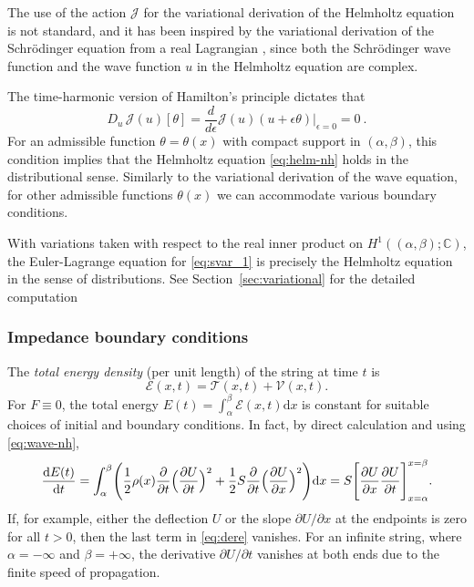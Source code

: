\documentclass[twoside,11pt]{article}
\def\d{{\mathrm d}}
\begin{document}
{The use of the action $\mathcal{J}$ for the variational derivation of the Helmholtz equation is not standard, and it has been inspired by the variational derivation of the Schr\"odinger equation from a real Lagrangian \cite{Mo_book}, since both the  Schr\"odinger wave function and the wave function $u$ in the Helmholtz equation are complex.

The time-harmonic version of Hamilton's principle dictates that
\begin{equation}\label{eq:svar_1}
 {D_{u}\, \mathcal{J}{(u)}[\theta]=\frac{d}{d\epsilon}\mathcal{J}{(u)}(u+\epsilon \theta)|_{\epsilon=0}=0} \ .
\end{equation}
For an admissible function $\theta=\theta(x)$ with compact support in $(\alpha,\beta)$,  this condition implies that the Helmholtz equation \eqref{eq:helm-nh} holds in the distributional sense.
Similarly to the variational derivation of the wave equation, for other admissible functions $\theta(x)$ we can    accommodate various boundary conditions.


  {With variations taken with respect to the real inner product on $H^1((\alpha,\beta);\mathbb{C})$, the Euler-Lagrange equation for \eqref{eq:svar_1} is precisely the Helmholtz equation in the sense of distributions. See Section~\ref{sec:variational} for the detailed computation }



 
\subsubsection*{Impedance boundary conditions}

The \emph{total energy density} (per unit length) of the string at time $t$ is
\begin{equation}\label{eq:endens}
\mathcal{E}(x,t)= \mathcal{T}(x,t)+\mathcal{V}(x,t)   .
\end{equation}
For $F\equiv 0$, the total energy $E(t)=\int_{\alpha}^{\beta} \mathcal{E}(x,t)  \d x$ is constant for suitable choices of initial and boundary conditions. In fact, by direct calculation and using \eqref{eq:wave-nh},
\begin{equation}\label{eq:dere}
\frac{\d E(t)}{\d t}
= \int_{\alpha}^{\beta}\Biggl( \frac12  \rho(x) \frac{\partial}{\partial t}\Bigl(\frac{\partial U}{\partial t}\Bigr)^2
+ \frac12   S  \frac{\partial}{\partial t}\Bigl(\frac{\partial U}{\partial x}\Bigr)^2 \Biggr)  \d x
= S \Biggl[\frac{\partial U}{\partial x} \frac{\partial U}{\partial t}\Biggr]_{x=\alpha}^{x=\beta}   .
\end{equation}
If, for example, either the deflection $U$ or the slope $\partial U/\partial x$ at the endpoints is zero for all $t>0$, then the last term in \eqref{eq:dere} vanishes.
For an infinite string, where $\alpha=-\infty$ and $\beta=+\infty$, the derivative $\partial U/\partial t$ vanishes at both ends due to the finite speed of propagation.

}
\end{document}

